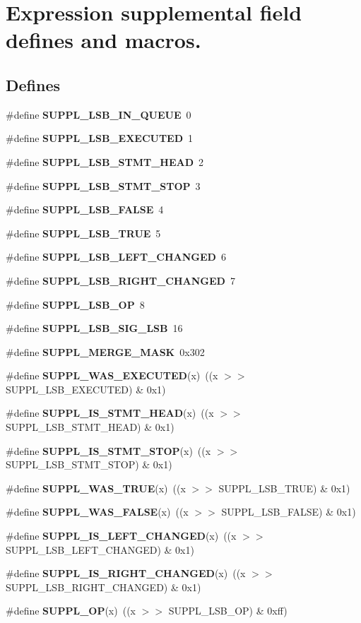 \section{Expression supplemental field defines and macros.}
\label{group__expr__suppl}
\subsection*{Defines}
\begin{CompactItemize}
\item 
\#define {\bf SUPPL\_\-LSB\_\-IN\_\-QUEUE}\ 0
\item 
\#define {\bf SUPPL\_\-LSB\_\-EXECUTED}\ 1
\item 
\#define {\bf SUPPL\_\-LSB\_\-STMT\_\-HEAD}\ 2
\item 
\#define {\bf SUPPL\_\-LSB\_\-STMT\_\-STOP}\ 3
\item 
\#define {\bf SUPPL\_\-LSB\_\-FALSE}\ 4
\item 
\#define {\bf SUPPL\_\-LSB\_\-TRUE}\ 5
\item 
\#define {\bf SUPPL\_\-LSB\_\-LEFT\_\-CHANGED}\ 6
\item 
\#define {\bf SUPPL\_\-LSB\_\-RIGHT\_\-CHANGED}\ 7
\item 
\#define {\bf SUPPL\_\-LSB\_\-OP}\ 8
\item 
\#define {\bf SUPPL\_\-LSB\_\-SIG\_\-LSB}\ 16
\item 
\#define {\bf SUPPL\_\-MERGE\_\-MASK}\ 0x302
\item 
\#define {\bf SUPPL\_\-WAS\_\-EXECUTED}(x)\ ((x $>$$>$ SUPPL\_\-LSB\_\-EXECUTED) \& 0x1)
\item 
\#define {\bf SUPPL\_\-IS\_\-STMT\_\-HEAD}(x)\ ((x $>$$>$ SUPPL\_\-LSB\_\-STMT\_\-HEAD) \& 0x1)
\item 
\#define {\bf SUPPL\_\-IS\_\-STMT\_\-STOP}(x)\ ((x $>$$>$ SUPPL\_\-LSB\_\-STMT\_\-STOP) \& 0x1)
\item 
\#define {\bf SUPPL\_\-WAS\_\-TRUE}(x)\ ((x $>$$>$ SUPPL\_\-LSB\_\-TRUE) \& 0x1)
\item 
\#define {\bf SUPPL\_\-WAS\_\-FALSE}(x)\ ((x $>$$>$ SUPPL\_\-LSB\_\-FALSE) \& 0x1)
\item 
\#define {\bf SUPPL\_\-IS\_\-LEFT\_\-CHANGED}(x)\ ((x $>$$>$ SUPPL\_\-LSB\_\-LEFT\_\-CHANGED) \& 0x1)
\item 
\#define {\bf SUPPL\_\-IS\_\-RIGHT\_\-CHANGED}(x)\ ((x $>$$>$ SUPPL\_\-LSB\_\-RIGHT\_\-CHANGED) \& 0x1)
\item 
\#define {\bf SUPPL\_\-OP}(x)\ ((x $>$$>$ SUPPL\_\-LSB\_\-OP) \& 0xff)
\end{CompactItemize}


